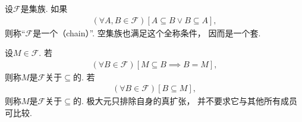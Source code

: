 \begin{definition}
    设\(\mathscr{F}\)是集族.
    如果
    \begin{align*}
        (\forall A,B\in\mathscr{F})[A\subseteq B\lor B\subseteq A],
    \end{align*}
    则称“\(\mathscr{F}\)是一个（chain）”.
    空集族也满足这个全称条件，
    因而是一个套.
\end{definition}

\begin{definition}
    设\(M\in\mathscr{F}\).
    若
    \begin{align*}
        (\forall B\in\mathscr{F})[M\subseteq B\implies B=M],
    \end{align*}
    则称\(M\)是\(\mathscr{F}\)关于\(\subseteq\)的.
    若
    \begin{align*}
        (\forall B\in\mathscr{F})[B\subseteq M],
    \end{align*}
    则称\(M\)是\(\mathscr{F}\)关于\(\subseteq\)的.
    极大元只排除自身的真扩张，
    并不要求它与其他所有成员可比较.
\end{definition}

